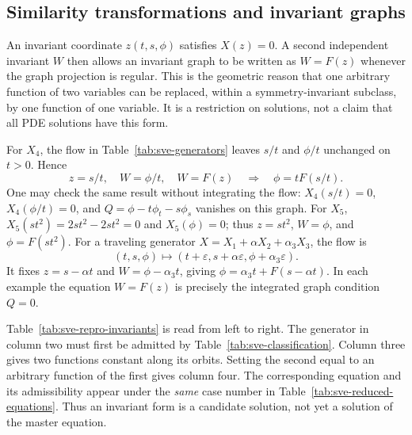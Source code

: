 \subsection{Similarity transformations and invariant graphs}
An invariant coordinate $z(t,s,\phi)$ satisfies $X(z)=0$. A second
independent invariant $W$ then allows an invariant graph to be written
as $W=F(z)$ whenever the graph projection is regular. This is the
geometric reason that one arbitrary function of two variables can be
replaced, within a symmetry-invariant subclass, by one function of one
variable. It is a restriction on solutions, not a claim that all PDE
solutions have this form.

For $X_4$, the flow in Table~\ref{tab:sve-generators} leaves $s/t$ and
$\phi/t$ unchanged on $t>0$. Hence
\[
 z=s/t,\quad W=\phi/t,\quad W=F(z)
 \quad\Longrightarrow\quad \phi=tF(s/t).
\]
One may check the same result without integrating the flow:
$X_4(s/t)=0$, $X_4(\phi/t)=0$, and
$Q=\phi-t\phi_t-s\phi_s$ vanishes on this graph.
For $X_5$, $X_5(st^2)=2st^2-2st^2=0$ and $X_5(\phi)=0$;
thus $z=st^2$, $W=\phi$, and $\phi=F(st^2)$.
For a traveling generator
$X=X_1+\alpha X_2+\alpha_3X_3$, the flow is
\[
 (t,s,\phi)\longmapsto
 (t+\varepsilon,s+\alpha\varepsilon,\phi+\alpha_3\varepsilon).
\]
It fixes $z=s-\alpha t$ and $W=\phi-\alpha_3t$, giving
$\phi=\alpha_3t+F(s-\alpha t)$. In each example the equation
$W=F(z)$ is precisely the integrated graph condition $Q=0$.

Table~\ref{tab:sve-repro-invariants} is read from left to right.
The generator in column two must first be admitted by
Table~\ref{tab:sve-classification}. Column three gives two functions
constant along its orbits. Setting the second equal to an arbitrary
function of the first gives column four. The corresponding equation and
its admissibility appear under the \emph{same} case number in
Table~\ref{tab:sve-reduced-equations}. Thus an invariant form is a
candidate solution, not yet a solution of the master equation.

